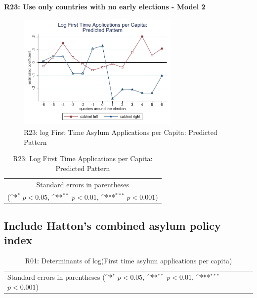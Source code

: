 \documentclass[10pt,a4paper]{scrartcl}
\begin{document}
\clearpage
\textbf{R23: Use only countries with no early elections - Model 2}
\begin{figure}[!ht]
	\centering
	\includegraphics[width=0.7\textwidth]{figures_edited/app_graph2_R23.pdf}
	\caption{R23: log First Time Asylum Applications per Capita: Predicted Pattern}
\end{figure}

\begin{table}[!ht]\centering
	\footnotesize
	\renewcommand{\arraystretch}{1.2}
	\def\sym#1{\ifmmode^{#1}\else\(^{#1}\)\fi}
	\caption{R23: Log First Time Applications per Capita: Predicted Pattern}
	\begin{tabular}{l*{2}{c}}
		\hline\hline
		
		\hline\hline
		\multicolumn{3}{c}{\footnotesize Standard errors in parentheses} \\
		\multicolumn{3}{c}{\footnotesize (\sym{*} \(p<0.05\), \sym{**} \(p<0.01\), \sym{***} \(p<0.001\))} \\
	\end{tabular}
\end{table}



\clearpage
\FloatBarrier
\subsection{Include Hatton's combined asylum policy index}
\begin{table}[!ht]\centering
	\renewcommand{\arraystretch}{1.25}
	\small
	\def\sym#1{\ifmmode^{#1}\else\(^{#1}\)\fi}
	\caption{R01: Determinants of log(First time asylum applications per capita)}
	\begin{tabular}{l*{3}{c}}
		\hline\hline
		
		\hline\hline
		\multicolumn{4}{l}{\footnotesize Standard errors in parentheses (\sym{*} \(p<0.05\), \sym{**} \(p<0.01\), \sym{***} \(p<0.001\))}\\
	\end{tabular}
\end{table}
\end{document}
